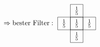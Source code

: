             \begin{equation*}
                \Rightarrow \text{bester Filter} : \ \raisebox{-0.9cm}{\begin{tikzpicture}[scale = 1.3]
                        \draw[step = 0.5] (0,0) grid (0.5,1.5);
                        \draw[step = 0.5] (-0.5,1) grid (1,0.5);
                        \draw (0.25,1.25) node {$\frac{1}{5}$};
                        \draw (0.25,0.75) node {$\frac{1}{5}$};
                        \draw (0.25,0.25) node {$\frac{1}{5}$};
                        \draw (-0.25,0.75) node {$\frac{1}{5}$};
                        \draw (0.75,0.75) node {$\frac{1}{5}$};
                    \end{tikzpicture}}
                \end{equation*}
